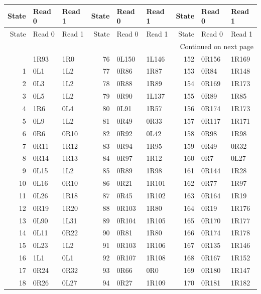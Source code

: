 \begingroup\small\ttfamily
\setlength{\tabcolsep}{5pt}
\begin{longtable}{@{}rll@{\hspace{7mm}}rll@{\hspace{7mm}}rll@{}}
\toprule
\textrm{State}&\textrm{Read 0}&\textrm{Read 1}&\textrm{State}&\textrm{Read 0}&\textrm{Read 1}&\textrm{State}&\textrm{Read 0}&\textrm{Read 1}\\
\midrule\endfirsthead
\toprule
\textrm{State}&\textrm{Read 0}&\textrm{Read 1}&\textrm{State}&\textrm{Read 0}&\textrm{Read 1}&\textrm{State}&\textrm{Read 0}&\textrm{Read 1}\\
\midrule\endhead
\midrule\multicolumn{9}{r}{\textrm{Continued on next page}}\\\endfoot
\bottomrule\endlastfoot
0 & 1R93 & 1R0 & 76 & 0L150 & 1L146 & 152 & 0R156 & 1R169\\
1 & 0L1 & 1L2 & 77 & 0R86 & 1R87 & 153 & 0R84 & 1R148\\
2 & 0L3 & 1L2 & 78 & 0R88 & 1R89 & 154 & 0R169 & 1R173\\
3 & 0L5 & 1L2 & 79 & 0R90 & 1L137 & 155 & 0R89 & 1R85\\
4 & 1R6 & 0L4 & 80 & 0L91 & 1R57 & 156 & 0R174 & 1R173\\
5 & 0L9 & 1L2 & 81 & 0R49 & 0R33 & 157 & 0R117 & 1R171\\
6 & 0R6 & 0R10 & 82 & 0R92 & 0L42 & 158 & 0R98 & 1R98\\
7 & 0R11 & 1R12 & 83 & 0R94 & 1R95 & 159 & 0R49 & 0R32\\
8 & 0R14 & 1R13 & 84 & 0R97 & 1R12 & 160 & 0R7 & 0L27\\
9 & 0L15 & 1L2 & 85 & 0R89 & 1R98 & 161 & 0R144 & 1R28\\
10 & 0L16 & 0R10 & 86 & 0R21 & 1R101 & 162 & 0R77 & 1R97\\
11 & 0L26 & 1R18 & 87 & 0R45 & 1R102 & 163 & 0R164 & 1R19\\
12 & 0R19 & 1R20 & 88 & 0R103 & 1R80 & 164 & 0R19 & 1R176\\
13 & 0L90 & 1L31 & 89 & 0R104 & 1R105 & 165 & 0R170 & 1R177\\
14 & 0L11 & 0R22 & 90 & 0R81 & 1R80 & 166 & 0R174 & 1R178\\
15 & 0L23 & 1L2 & 91 & 0R103 & 1R106 & 167 & 0R135 & 1R146\\
16 & 1L1 & 0L1 & 92 & 0R107 & 1R108 & 168 & 0R167 & 1R152\\
17 & 0R24 & 0R32 & 93 & 0R66 & 0R0 & 169 & 0R180 & 1R147\\
18 & 0R26 & 0L27 & 94 & 0R27 & 1R109 & 170 & 0R181 & 1R182\\

\end{longtable}
